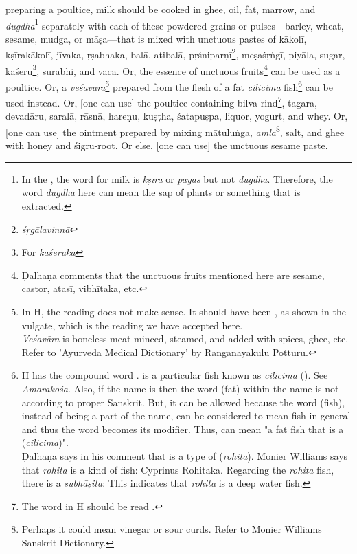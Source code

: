 \begin{translation}
preparing a poultice, milk should be cooked in ghee, oil, fat, marrow, and \emph{dugdha}\footnote{In the \SS, the word for milk is \textit{kṣīra} or \textit{payas} but not \textit{dugdha}. Therefore, the word \textit{dugdha} here can mean the sap of plants or something that is extracted.} separately with each of these powdered grains or pulses---barley, wheat, sesame, \gls{mudga}, or \gls{māṣa}---that is mixed with unctuous pastes of \gls{kākolī}, \gls{kṣīrakākolī}, \gls{jīvaka}, \gls{ṛṣabhaka}, \gls{balā}, \gls{atibalā}, \gls{pṛśniparṇī}\footnote{\emph{śṛgālavinnā}}, \gls{meṣaśṛṅgī}, \gls{piyāla}, sugar, \gls{kaśeru}\footnote{For \emph{kaśerukā}}, \gls{surabhi}, and \gls{vacā}. Or, the essence of unctuous fruits\footnote{Ḍalhaṇa comments \citep[425]{vulgate} that the unctuous fruits mentioned here are sesame, castor, \gls{atasī}, \gls{vibhītaka}, etc.} can be used as a poultice. Or, a \textit{veśavāra}\footnote{In H, the reading  does not make sense. It should have been , as shown in the vulgate, which is the reading we have accepted here.\\ \textit{Veśavāra} is boneless meat minced, steamed, and added with spices, ghee, etc. Refer to 'Ayurveda Medical Dictionary' by Ranganayakulu Potturu.} prepared from the flesh of a fat \textit{cilicima} fish\footnote{H has the compound word .  is a particular fish known as \textit{cilicima} (). See \textit{Amarakośa}. Also, if the name is  then the word  (fat) within the name is not according to proper Sanskrit. But, it can be allowed because the word  (fish), instead of being a part of the name, can be considered to mean fish in general and thus the word  becomes its modifier. Thus,  can mean "a fat fish that is a  (\textit{cilicima})".\\ Ḍalhaṇa says in his comment \citep[425]{vulgate} that  is a type of  (\textit{rohita}). Monier Williams says that \textit{rohita} is a kind of fish: Cyprinus Rohitaka. Regarding the \textit{rohita} fish, there is a \textit{subhāṣita}:  This indicates that \textit{rohita} is a deep water fish.} can be used instead. Or, [one can use] the poultice containing \gls{bilva}-rind\footnote{The word  in H should be read .}, \gls{tagara}, \gls{devadāru}, \gls{saralā}, \gls{rāsnā}, \gls{hareṇu}, \gls{kuṣṭha}, \gls{śatapuṣpa}, liquor, yogurt, and whey. Or, [one can use] the ointment prepared by mixing \gls{mātuluṅga}, \emph{amla}\footnote{Perhaps it could mean vinegar or sour curds. Refer to Monier Williams Sanskrit Dictionary.}, salt, and ghee with honey and \gls{śigru}-root. Or else, [one can use] the unctuous sesame paste. 


\end{translation}
